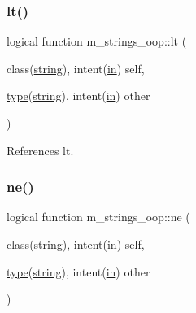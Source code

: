 \mbox{\label{namespacem__strings__oop_a332288f9bebc563e12671b514512eb30}} 
\subsubsection{\texorpdfstring{lt()}{lt()}}
{\footnotesize\ttfamily logical function m\+\_\+strings\+\_\+oop\+::lt (\begin{DoxyParamCaption}\item[{class(\hyperlink{structm__strings__oop_1_1string}{string}), intent(\hyperlink{M__journal_83_8txt_afce72651d1eed785a2132bee863b2f38}{in})}]{self,  }\item[{\hyperlink{stop__watch_83_8txt_a70f0ead91c32e25323c03265aa302c1c}{type}(\hyperlink{structm__strings__oop_1_1string}{string}), intent(\hyperlink{M__journal_83_8txt_afce72651d1eed785a2132bee863b2f38}{in})}]{other }\end{DoxyParamCaption})\hspace{0.3cm}{\ttfamily [private]}}



References lt.

\mbox{\label{namespacem__strings__oop_aa424e1eccc45bb143172d6e212f8e408}} 
\subsubsection{\texorpdfstring{ne()}{ne()}}
{\footnotesize\ttfamily logical function m\+\_\+strings\+\_\+oop\+::ne (\begin{DoxyParamCaption}\item[{class(\hyperlink{structm__strings__oop_1_1string}{string}), intent(\hyperlink{M__journal_83_8txt_afce72651d1eed785a2132bee863b2f38}{in})}]{self,  }\item[{\hyperlink{stop__watch_83_8txt_a70f0ead91c32e25323c03265aa302c1c}{type}(\hyperlink{structm__strings__oop_1_1string}{string}), intent(\hyperlink{M__journal_83_8txt_afce72651d1eed785a2132bee863b2f38}{in})}]{other }\end{DoxyParamCaption})\hspace{0.3cm}{\ttfamily [private]}}


